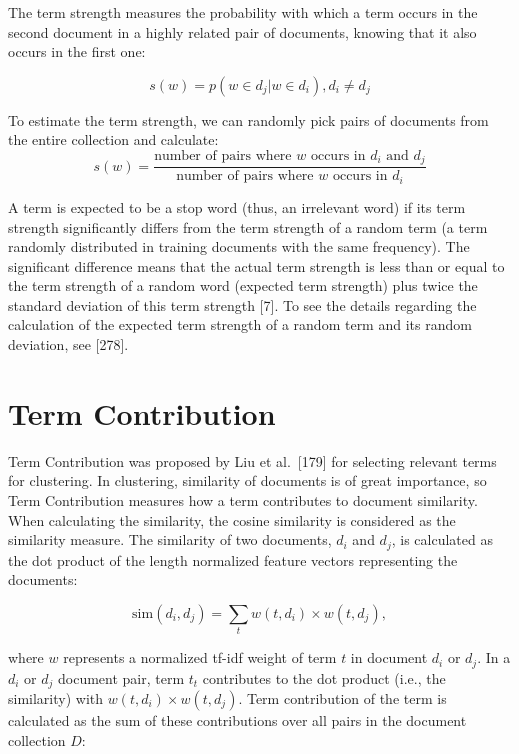 \documentclass[11pt,openany,executivepaper]{book}
\begin{document}
The term strength measures the probability with which a term occurs in the second document in a highly related pair of documents, knowing that it also occurs in the first one:

\begin{equation}
    s(w) = p(w \in d_j | w \in d_i), d_i \ne d_j
\end{equation}

To estimate the term strength, we can randomly pick pairs of documents from the entire collection and calculate:
\begin{equation}
    s(w) = \frac{\text{number of pairs where } w \text{ occurs in } d_i \text{ and } d_j}{\text{number of pairs where } w \text{ occurs in } d_i}
\end{equation}

A term is expected to be a stop word (thus, an irrelevant word) if its term strength significantly differs from the term strength of a random term (a term randomly distributed in training documents with the same frequency). The significant difference means that the actual term strength is less than or equal to the term strength of a random word (expected term strength) plus twice the standard deviation of this term strength [7]. To see the details regarding the calculation of the expected term strength of a random term and its random deviation, see [278].

\section{Term Contribution}

Term Contribution was proposed by Liu et al.\ [179] for selecting relevant terms for clustering. In clustering, similarity of documents is of great importance, so Term Contribution measures how a term contributes to document similarity. When calculating the similarity, the cosine similarity is considered as the similarity measure. The similarity of two documents, $d_i$ and $d_j$, is calculated as the dot product of the length normalized feature vectors representing the documents:

\begin{equation}
    \text{sim}(d_i, d_j) = \sum_{t} w(t, d_i) \times w(t, d_j),
\end{equation}

where $w$ represents a normalized tf-idf weight of term $t$ in document $d_i$ or $d_j$. In a $d_i$ or $d_j$ document pair, term $t_t$ contributes to the dot product (i.e., the similarity) with $w(t, d_i) \times w(t, d_j)$. Term contribution of the term is calculated as the sum of these contributions over all pairs in the document collection $D$:
\end{document}
